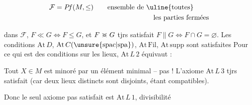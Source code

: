 \[
\begin{aligned}
&\mathcal F=P\!f(M,\leq)\qquad \text{ensemble de \uline{toutes}}\\
&\hspace{15em}\text{les parties fermées}
\end{aligned}
\]



dans $\mathcal F$, $F\ll G\Longleftrightarrow F\leq G$, et $F\mathrel{>\mkern-13mu<}G$ tjrs satisfait $F\parallel G\Longleftrightarrow F\cap G=\varnothing$.  Les conditions $\mathrm{At}\,D$, $\mathrm{At}\,C(\unsure{\mathrm{spac}|\mathrm{spa}})$, $\mathrm{At}\,\mathrm{Fil}$, $\mathrm{At}\,\mathrm{supp}$ sont satisfaites Pour ce  qui est des conditions sur les lieux, $\mathrm{At}\,L\,2$ équivaut :

Tout  $X\in M$ est minoré par un élément minimal --  pas  ! L'axiome $\mathrm{At}\,L\,3$ tjrs satisfait (car deux lieux distincts sont disjoints, étant compatibles).

Donc le seul axiome pas satisfait est $\mathrm{At}\,L\,1$, divisibilité

